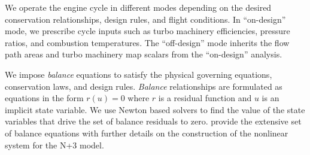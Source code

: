 \documentclass[conf]{new-aiaa}
\begin{document}
We operate the engine cycle in different modes depending on the desired conservation relationships, design rules, and flight conditions.
In ``on-design'' mode, we prescribe cycle inputs such as turbo machinery efficiencies, pressure ratios, and combustion temperatures.
The ``off-design'' mode inherits the flow path areas and turbo machinery map scalars from the ``on-design'' analysis.

We impose \emph{balance} equations to satisfy the physical governing equations, conservation laws, and design rules.
\emph{Balance} relationships are formulated as equations in the form $r(u)=0$ where $r$ is a residual function and $u$ is an implicit state variable.
We use Newton based solvers to find the value of the state variables that drive the set of balance residuals to zero.
\citeauthor{Hendricks2019} provide the extensive set of balance equations with further details on the construction of the nonlinear system for the N+3 model.
\end{document}
